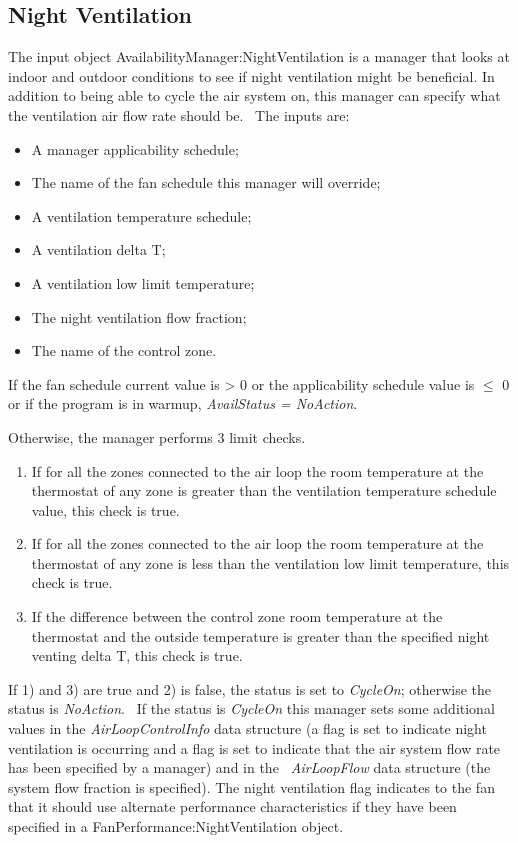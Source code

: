 \subsection{Night Ventilation}\label{night-ventilation}

The input object AvailabilityManager:NightVentilation is a manager that looks at indoor and outdoor conditions to see if night ventilation might be beneficial. In addition to being able to cycle the air system on, this manager can specify what the ventilation air flow rate should be.~ The inputs are:

\begin{itemize}
\item A manager applicability schedule;
\item The name of the fan schedule this manager will override;
\item A ventilation temperature schedule;
\item A ventilation delta T;
\item A ventilation low limit temperature;
\item The night ventilation flow fraction;
\item The name of the control zone.
\end{itemize}

If the fan schedule current value is \textgreater{} 0 or the applicability schedule value is \(\le\) 0 or if the program is in warmup, \emph{AvailStatus = NoAction}.

Otherwise, the manager performs 3 limit checks.

\begin{enumerate}
\item If for all the zones connected to the air loop the room temperature at the thermostat of any zone is greater than the ventilation temperature schedule value, this check is true.
\item If for all the zones connected to the air loop the room temperature at the thermostat of any zone is less than the ventilation low limit temperature, this check is true.
\item If the difference between the control zone room temperature at the thermostat and the outside temperature is greater than the specified night venting delta T, this check is true.
\end{enumerate}

If 1) and 3) are true and 2) is false, the status is set to \emph{CycleOn}; otherwise the status is \emph{NoAction}.~ If the status is \emph{CycleOn} this manager sets some additional values in the \emph{AirLoopControlInfo} data structure (a flag is set to indicate night ventilation is occurring and a flag is set to indicate that the air system flow rate has been specified by a manager) and in the \emph{~AirLoopFlow} data structure (the system flow fraction is specified). The night ventilation flag indicates to the fan that it should use alternate performance characteristics if they have been specified in a FanPerformance:NightVentilation object.

